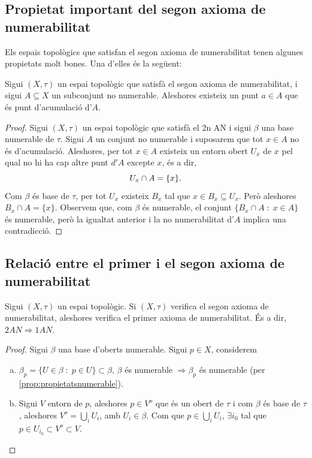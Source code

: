 \documentclass[../main.tex]{subfiles}
\begin{document}
\subsection{Propietat important del segon axioma de numerabilitat}
Els espais topològics que satisfan el segon axioma de numerabilitat tenen algunes propietats molt bones. Una d'elles és la següent:
\begin{prop}
\label{prop:propietat2AN} Sigui $(X,\tau)$ un espai topològic que satisfà el segon axioma de numerabilitat, i sigui $A\subseteq X$ un subconjunt no numerable. Aleshores existeix un punt $a\in A$ que és punt d'acumulació d'$A$.
\end{prop}
\begin{proof}
Sigui $(X,\tau)$ un espai topològic que satisfà el 2n AN i sigui $\beta$ una base numerable de $\tau$. Sigui $A$ un conjunt no numerable i suposarem que tot $x\in A$ no és d'acumulació. Aleshores, per tot $x\in A$ existeix un entorn obert $U_x$ de $x$ pel qual no hi ha cap altre punt $d'A$ excepte $x$, és a dir,
\begin{equation}
    \notag
    U_x\cap A = \{x\} .
\end{equation}
Com $\beta$ és base de $\tau$, per tot $U_x$ existeix $B_x$ tal que $x\in B_x\subseteq U_x$. Però aleshores $B_x\cap A = \{x\}$. Observem que, com $\beta$ és numerable, el conjunt $\{B_x\cap A\;:\;x\in A\}$ és numerable, però la igualtat anterior i la no numerabilitat d'$A$ implica una contradicció.
\end{proof}

\subsection{Relació entre el primer i el segon axioma de numerabilitat}
\begin{prop}
\label{prop:2animplica1an} Sigui $(X,\tau)$ un espai topològic. Si $(X,\tau)$ verifica el segon axioma de numerabilitat, aleshores verifica el primer axioma de numerabilitat. És a dir, $2AN\Rightarrow 1AN$.
\end{prop}
\begin{proof}
Sigui $\beta$ una base d'oberts numerable. Sigui $p\in X$, considerem
\begin{enumerate}[a)]
    \item $\beta_p=\{U\in\beta\;:\;p\in U\}\subset\beta$, $\beta$ és numerable $\Rightarrow \beta_p$ és numerable (per \ref{prop:propietatsnumerable}).
    \item Sigui $V$ entorn de $p$, aleshores $p\in V^{o}$ que és un obert de $\tau$ i com $\beta$ és base de $\tau$, aleshores $V^{o}=\bigcup_i U_i$, amb $U_i\in \beta$. Com que $p\in \bigcup_i U_i$, $\exists i_0$ tal que $p\in U_{i_0}\subset V^{o}\subset V$.
\end{enumerate}
\end{proof}
\end{document}
